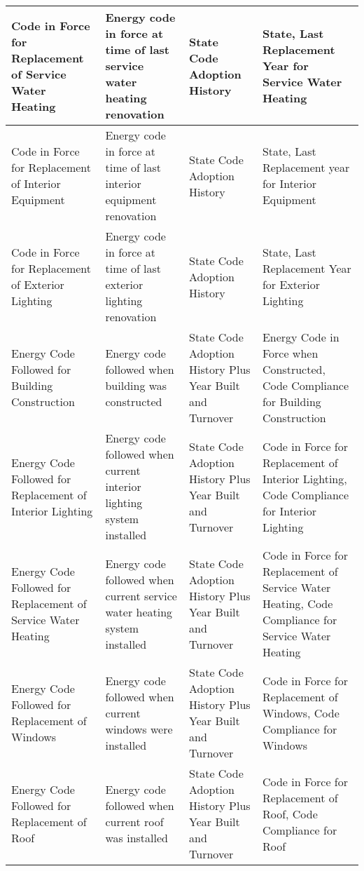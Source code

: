 \begin{center}
\begin{longtable}{|p{1.3in}|p{1.5in}|p{1.5in}|p{1.5in}|}
Code in Force for Replacement of Service Water Heating          & Energy code in force at time of last service water heating renovation          & State Code Adoption History                                 & State, Last Replacement Year for Service Water Heating                                               \\ \hline
Code in Force for Replacement of Interior Equipment             & Energy code in force at time of last interior equipment renovation             & State Code Adoption History                                 & State, Last Replacement year for Interior Equipment                                                  \\ \hline
Code in Force for Replacement of Exterior Lighting              & Energy code in force at time of last exterior lighting renovation              & State Code Adoption History                                 & State, Last Replacement Year for Exterior Lighting                                                   \\ \hline
Energy Code Followed for Building Construction                  & Energy code followed when building was constructed                             & State Code Adoption History Plus Year Built and Turnover    & Energy Code in Force when Constructed, Code Compliance for Building Construction                     \\ \hline
Energy Code Followed for Replacement of Interior Lighting       & Energy code followed when current interior lighting system installed           & State Code Adoption History Plus Year Built and Turnover    & Code in Force for Replacement of Interior Lighting, Code Compliance for Interior Lighting            \\ \hline
Energy Code Followed for Replacement of Service Water Heating   & Energy code followed when current service water heating system installed       & State Code Adoption History Plus Year Built and Turnover    & Code in Force for Replacement of Service Water Heating, Code Compliance for Service Water Heating    \\ \hline
Energy Code Followed for Replacement of Windows                 & Energy code followed when current windows were installed                       & State Code Adoption History Plus Year Built and Turnover    & Code in Force for Replacement of Windows, Code Compliance for Windows                                \\ \hline
Energy Code Followed for Replacement of Roof                    & Energy code followed when current roof was installed                           & State Code Adoption History Plus Year Built and Turnover    & Code in Force for Replacement of Roof, Code Compliance for Roof                                      \\ \hline

\end{longtable}
\end{center}
